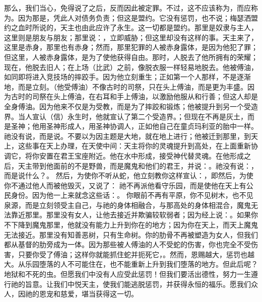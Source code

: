 那么，我们当心，免得说了之后，反而因此被定罪。不过，这不应该称为，而应称为。因为那是，凭此人对债务负责；但这是盟约。它没有惩罚，也不说；梅瑟洒盟约之血时所说的，天主也由此应许了永生。这一切都是盟约。那里是奴隶与主人，这里则是朋友与朋友；那里说：，立即威胁；但这里却没有这样的事。天主来了，这里是赤身，那里也有赤身；然而，那里犯罪的人被赤身露体，是因为他犯了罪；但这里，人被赤身露体，是为了使他获得自由。那时，人脱去了他所拥有的荣耀；现在，他脱去旧人；在上场（比武）之前，像脱衣服一样轻易地脱去。他被傅油，如同即将进入竞技场的摔跤手。因为他立刻重生；正如第一个人那样，不是逐渐地，而是立刻。（他受傅油）不像古时的司祭，只在头上傅油，而是更为丰盛。因为古时的司祭在头上傅油，在右耳和手上傅油，以激励他服从和行善；但这人却是全身傅油。因为他来不仅是为受教，而是为了摔跤和锻炼；他被提升到另一个受造界。当人宣认（信）永生时，他就宣认了第二个受造界。；但现在不再是灰土，而是圣神；他用圣神形成人，用圣神协调人，正如他自己在童贞玛利亚的胎中一样。祂没有说，而是说。不要以为因主题是大地，就在地上进行；他被迁到那里，到天上，这些事在天上办理，在天使中间：天主将你的灵魂提升到高处，在上面重新协调它，将你安置在君王宝座附近。他在水中形成，接受神代替灵魂。在他形成之后，天主带到他面前的不是野兽，而是魔鬼和他们的君王，并说：。祂没有说：，而是说什么？。 然后，为使你不听从蛇，他立刻教你这样宣认：，即然后，为使你不通过他人而被他毁灭，又说了： 祂不再派他看守乐园，而是使他在天上有公民身份。因为他一上来就念这些话：。 你眼前不再有平原，你不见树木，也不见泉源，而是立刻领受主自己，与祂的身体相融合，与那高处的身体相混合，魔鬼无法靠近那里。那里没有女人，让他去接近并欺骗较软弱者；因为经上说：。如果你不下降到魔鬼那里，他就没有能力上升到你在的地方；因为你在天上，而天上魔鬼无法接近。那里没有知善恶树，只有生命树。你的肋骨不再被塑造为女人，但我们都从基督的肋旁成为一体。因为那些被人傅油的人不受蛇的伤害，你也完全不受伤害，只要你受了傅油；这样你就能抓住蛇并扼死它，。然而，恩赐越大，惩罚也越大。从乐园堕落的人不可能住在，也不能重新上升到我们堕落的地方。但此后呢？地狱和不死的虫。但愿我们中没有人应受此惩罚！但我们要活出德性，努力一生遵行祂的旨意。让我们中悦天主，使我们能逃脱惩罚，并获得永恒的福乐。愿我们众人，因祂的恩宠和慈爱，堪当获得这一切。\par

